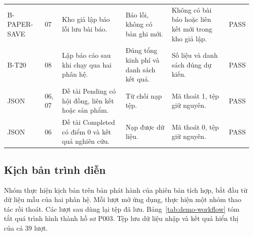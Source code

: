 {\begin{longtable}{@{}P{.175\linewidth}P{.055\linewidth}P{.192\linewidth}P{.181\linewidth}P{.185\linewidth}l@{}}
B-PAPER-SAVE & 07 & Kho giả lập báo lỗi lưu bài báo. & Báo lỗi, không có bản ghi mới. & Không có bài báo hoặc liên kết mới trong kho giả lập. & PASS \\
B-T20 & 08 & Lập báo cáo sau khi chạy qua hai phân hệ. & Đúng tổng kinh phí và danh sách kết quả. & Số liệu và danh sách đúng dự kiến. & PASS \\
JSON & 06, 07 & Đề tài Pending có hội đồng, liên kết hoặc sản phẩm. & Từ chối nạp tệp. & Mã thoát 1, tệp giữ nguyên. & PASS \\
JSON & 06 & Đề tài Completed có điểm 0 và kết quả nghiên cứu. & Nạp được dữ liệu. & Mã thoát 0, tệp giữ nguyên. & PASS \\
\end{longtable}
}

\subsection{Kịch bản trình diễn}\label{sec:demo-a}

Nhóm thực hiện kịch bản trên bản phát hành của phiên bản tích hợp, bắt đầu từ dữ liệu mẫu của hai phân hệ. Mỗi lượt mở ứng dụng, thực hiện một nhóm thao tác rồi thoát. Các lượt sau dùng lại tệp đã lưu. Bảng~\ref{tab:demo-workflow} tóm tắt quá trình hình thành hồ sơ P003. Tệp  lưu dữ liệu nhập và kết quả hiển thị của cả 39 lượt.

